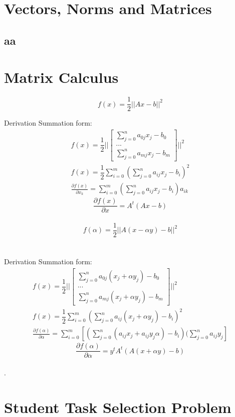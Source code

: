 \documentclass[12pt]{article}         %
\begin{document}
\section{Vectors, Norms and Matrices}


\subsection{aa}





\section{Matrix Calculus}

\begin{equation}
	f(x) = \dfrac{1}{2}||Ax - b||^2
\end{equation}


Derivation Summation form:
$$
\begin{aligned}
f(x) = \dfrac{1}{2}||
  \begin{bmatrix}
 \sum_{j=0}^{n}a_{0j}x_j - b_0\\
...\\
  \sum_{j=0}^{n}a_{mj}x_j - b_m
   \end{bmatrix}
||^2\\
f(x) = \dfrac{1}{2}\sum_{i=0}^{m}(\sum_{j=0}^{n}a_{ij}x_j - b_i)^2\\
\frac {\partial f(x)}{\partial x_k} = \sum_{i=0}^{m}(\sum_{j=0}^{n}a_{ij}x_j - b_i)a_{ik}
\end{aligned}
$$
$$
	\frac {\partial f(x)}{\partial x}  = A^t(Ax - b)
$$\\
\begin{equation}
	f(\alpha) = \dfrac{1}{2}||A(x - \alpha y) - b||^2
\end{equation}
\\
\\
Derivation Summation form:
$$
\begin{aligned}
f(x) = \dfrac{1}{2}||
  \begin{bmatrix}
 \sum_{j=0}^{n}a_{0j}(x_j + \alpha y_j) - b_0\\
...\\
  \sum_{j=0}^{n}a_{mj}(x_j + \alpha y_j) - b_m
   \end{bmatrix}
||^2\\
f(x) = \dfrac{1}{2}\sum_{i=0}^{m}(\sum_{j=0}^{n}a_{ij}(x_j + \alpha y_j) - b_i)^2\\
\frac {\partial f(\alpha)}{\partial \alpha} = \sum_{i=0}^{m}[ ( \sum_{j=0}^{n}(a_{ij}x_j +a_{ij}y_j\alpha) - b_i)(\sum_{j=0}^{n}a_{ij}y_j]
\end{aligned}
$$
$$
	\frac {\partial f(\alpha)}{\partial \alpha} = y^tA^t(A(x +\alpha y) - b)
$$\\

	.


\section{Student Task Selection Problem}
\end{document}
